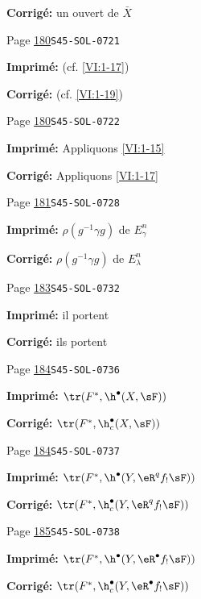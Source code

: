 \begin{description}
\par\noindent\textbf{Corrigé:} un ouvert de $\bar X$
\smallskip
\item[\hypertarget{apparatus:FR-0147}{147}] Page \hyperlink{printpage:fr:180}{180}\quad\texttt{S45-SOL-0721}
\par\noindent\textbf{Imprimé:} (cf. \ref{VI:1-17})
\par\noindent\textbf{Corrigé:} (cf. \ref{VI:1-19})
\smallskip
\item[\hypertarget{apparatus:FR-0148}{148}] Page \hyperlink{printpage:fr:180}{180}\quad\texttt{S45-SOL-0722}
\par\noindent\textbf{Imprimé:} Appliquons \ref{VI:1-15}
\par\noindent\textbf{Corrigé:} Appliquons \ref{VI:1-17}
\smallskip
\item[\hypertarget{apparatus:FR-0149}{149}] Page \hyperlink{printpage:fr:181}{181}\quad\texttt{S45-SOL-0728}
\par\noindent\textbf{Imprimé:} $\rho(g^{-1} \gamma g)$ de $E_\gamma^n$
\par\noindent\textbf{Corrigé:} $\rho(g^{-1} \gamma g)$ de $E_\lambda^n$
\smallskip
\item[\hypertarget{apparatus:FR-0150}{150}] Page \hyperlink{printpage:fr:183}{183}\quad\texttt{S45-SOL-0732}
\par\noindent\textbf{Imprimé:} il portent
\par\noindent\textbf{Corrigé:} ils portent
\smallskip
\item[\hypertarget{apparatus:FR-0151}{151}] Page \hyperlink{printpage:fr:184}{184}\quad\texttt{S45-SOL-0736}
\par\noindent\textbf{Imprimé:} \(\tr(F^\ast,\h^\bullet(X,\sF))\)
\par\noindent\textbf{Corrigé:} \(\tr(F^\ast,\h_c^\bullet(X,\sF))\)
\smallskip
\item[\hypertarget{apparatus:FR-0152}{152}] Page \hyperlink{printpage:fr:184}{184}\quad\texttt{S45-SOL-0737}
\par\noindent\textbf{Imprimé:} \(\tr(F^\ast, \h^\bullet(Y,\eR^q f_! \sF))\)
\par\noindent\textbf{Corrigé:} \(\tr(F^\ast,\h_c^\bullet(Y,\eR^q f_! \sF))\)
\smallskip
\item[\hypertarget{apparatus:FR-0153}{153}] Page \hyperlink{printpage:fr:185}{185}\quad\texttt{S45-SOL-0738}
\par\noindent\textbf{Imprimé:} \(\tr(F^\ast,\h^\bullet(Y,\eR^\bullet f_! \sF))\)
\par\noindent\textbf{Corrigé:} \(\tr(F^\ast,\h_c^\bullet(Y,\eR^\bullet f_! \sF))\)

\end{description}
